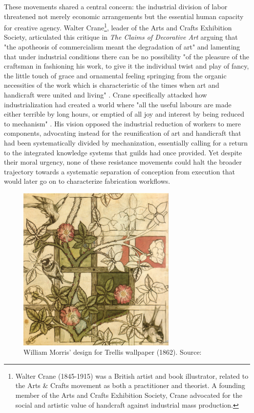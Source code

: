 These movements shared a central concern: the industrial division of labor threatened not merely economic arrangements but the essential human capacity for creative agency. Walter Crane\footnote{Walter Crane (1845-1915) was a British artist and book illustrator, related to the Arts \& Crafts movement as both a practitioner and theorist. A founding member of the Arts and Crafts Exhibition Society, Crane advocated for the social and artistic value of handcraft against industrial mass production.}, leader of the Arts and Crafts Exhibition Society, articulated this critique in \textit{The Claims of Decorative Art} arguing that "the apotheosis of commercialism meant the degradation of art" \citep{crane1892} and lamenting that under industrial conditions there can be no possibility "of the pleasure of the craftsman in fashioning his work, to give it the individual twist and play of fancy, the little touch of grace and ornamental feeling springing from the organic necessities of the work which is characteristic of the times when art and handicraft were united and living" \citep{crane1892}. Crane specifically attacked how industrialization had created a world where "all the useful labours are made either terrible by long hours, or emptied of all joy and interest by being reduced to mechanism" \citep{crane1892}. His vision opposed the industrial reduction of workers to mere components, advocating instead for the reunification of art and handicraft that had been systematically divided by mechanization, essentially calling for a return to the integrated knowledge systems that guilds had once provided. Yet despite their moral urgency, none of these resistance movements could halt the broader trajectory towards a systematic separation of conception from execution that would later go on to characterize fabrication workflows.

\begin{figure}[H]
\centering
\includegraphics[width=0.7\textwidth]{figures/chapter1/Trellis_Wallpaper.jpg}
\caption{William Morris' design for Trellis wallpaper (1862). Source: \citet{morris_trellis_1862}}
\label{fig:morris_trellis_wallpaper}
\end{figure}

